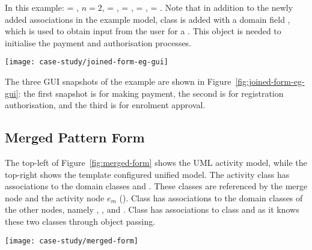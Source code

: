 In this example:  = , $ n = 2 $,  = ,  = ,  = ,  = .
Note that in addition to the newly added associations in the example model, class  is added with a domain field , which is used to obtain input from the user for a . This  object is needed to initialise the payment and authorisation processes.

\begin{figure*}[ht]
	\begin{center}
		\texttt{[image: case-study/joined-form-eg-gui]}
	\end{center}
	\caption{The joined pattern form view of enrolment management activity.} %
	\label{fig:joined-form-eg-gui}
\end{figure*}

The three GUI snapshots of the example are shown in Figure~\ref{fig:joined-form-eg-gui}: the first snapshot is for making payment, the second is for registration authorisation, and the third is for enrolment approval.

\subsection{Merged Pattern Form} \label{sect:merged-pattern}

The top-left of Figure~\ref{fig:merged-form} shows the UML activity model, while the top-right shows the template configured unified model. The activity class  has associations to the domain classes  and . These classes are referenced by the merge node and the activity node $ e_m $ (\resp). Class  has associations to the domain classes of the other nodes, namely , , and . Class  has associations to class  and  as it knows these two classes through object passing.

\begin{figure*}%
\begin{center}
\texttt{[image: case-study/merged-form]}
\end{center}
\caption{The merged pattern form.} %
\label{fig:merged-form}
\end{figure*}

